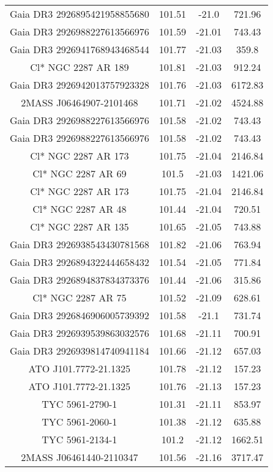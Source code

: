 \begin{table}
\begin{tabular}{cccc}
Gaia DR3 2926895421958855680 & 101.51 & -21.0 & 721.96 \\
Gaia DR3 2926988227613566976 & 101.59 & -21.01 & 743.43 \\
Gaia DR3 2926941768943468544 & 101.77 & -21.03 & 359.8 \\
Cl* NGC 2287     AR     189 & 101.81 & -21.03 & 912.24 \\
Gaia DR3 2926942013757923328 & 101.76 & -21.03 & 6172.83 \\
2MASS J06464907-2101468 & 101.71 & -21.02 & 4524.88 \\
Gaia DR3 2926988227613566976 & 101.58 & -21.02 & 743.43 \\
Gaia DR3 2926988227613566976 & 101.58 & -21.02 & 743.43 \\
Cl* NGC 2287     AR     173 & 101.75 & -21.04 & 2146.84 \\
Cl* NGC 2287     AR      69 & 101.5 & -21.03 & 1421.06 \\
Cl* NGC 2287     AR     173 & 101.75 & -21.04 & 2146.84 \\
Cl* NGC 2287     AR      48 & 101.44 & -21.04 & 720.51 \\
Cl* NGC 2287     AR     135 & 101.65 & -21.05 & 743.88 \\
Gaia DR3 2926938543430781568 & 101.82 & -21.06 & 763.94 \\
Gaia DR3 2926894322444658432 & 101.54 & -21.05 & 771.84 \\
Gaia DR3 2926894837834373376 & 101.44 & -21.06 & 315.86 \\
Cl* NGC 2287     AR      75 & 101.52 & -21.09 & 628.61 \\
Gaia DR3 2926846906005739392 & 101.58 & -21.1 & 731.74 \\
Gaia DR3 2926939539863032576 & 101.68 & -21.11 & 700.91 \\
Gaia DR3 2926939814740941184 & 101.66 & -21.12 & 657.03 \\
ATO J101.7772-21.1325 & 101.78 & -21.12 & 157.23 \\
ATO J101.7772-21.1325 & 101.76 & -21.13 & 157.23 \\
TYC 5961-2790-1 & 101.31 & -21.11 & 853.97 \\
TYC 5961-2060-1 & 101.38 & -21.12 & 635.88 \\
TYC 5961-2134-1 & 101.2 & -21.12 & 1662.51 \\
2MASS J06461440-2110347 & 101.56 & -21.16 & 3717.47 \\
\end{tabular}
\end{table}
